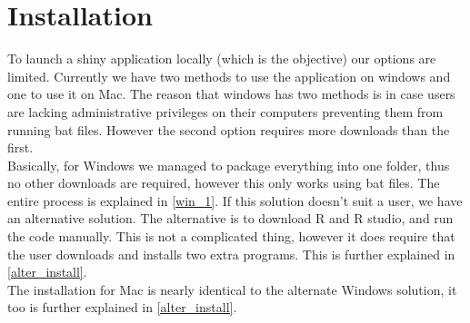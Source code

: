 \documentclass[11pt]{article}
\begin{document}
\section{Installation \label{install}}
To launch a shiny application locally (which is the objective) our options are limited. Currently we have two methods to use the application on windows and one to use it on Mac.
The reason that windows has two methods is in case users are lacking administrative privileges on their computers preventing them from running bat files. However the second option requires more downloads than the first.\\
Basically, for Windows we managed to package everything into one folder, thus no other downloads are required, however this only works using bat files. The entire process is explained in \autoref{win_1}.
If this solution doesn't suit a user, we have an alternative solution. The alternative is to download R and R studio, and run the code manually. This is not a complicated thing, however it does require that the user downloads and installs two extra programs. This is further explained in \autoref{alter_install}.\\
The installation for Mac is nearly identical to the alternate Windows solution, it too is further explained in \autoref{alter_install}.
\end{document}
